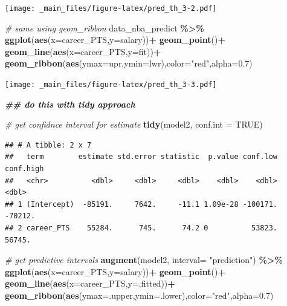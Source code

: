 \documentclass[
]{book}
\newenvironment{Shaded}{\begin{snugshade}}{\end{snugshade}}
\newcommand{\AttributeTok}[1]{\textcolor[rgb]{0.13,0.29,0.53}{#1}}
\newcommand{\CommentTok}[1]{\textcolor[rgb]{0.56,0.35,0.01}{\textit{#1}}}
\newcommand{\ConstantTok}[1]{\textcolor[rgb]{0.56,0.35,0.01}{#1}}
\newcommand{\DocumentationTok}[1]{\textcolor[rgb]{0.56,0.35,0.01}{\textbf{\textit{#1}}}}
\newcommand{\FloatTok}[1]{\textcolor[rgb]{0.00,0.00,0.81}{#1}}
\newcommand{\FunctionTok}[1]{\textcolor[rgb]{0.13,0.29,0.53}{\textbf{#1}}}
\newcommand{\NormalTok}[1]{#1}
\newcommand{\SpecialCharTok}[1]{\textcolor[rgb]{0.81,0.36,0.00}{\textbf{#1}}}
\newcommand{\StringTok}[1]{\textcolor[rgb]{0.31,0.60,0.02}{#1}}
\begin{document}
\texttt{[image: \_main\_files/figure-latex/pred\_th\_3-2.pdf]}

\begin{Shaded}
\begin{Highlighting}[]
\CommentTok{\# same using geom\_ribbon}
\NormalTok{data\_nba\_predict }\SpecialCharTok{\%\textgreater{}\%}
\FunctionTok{ggplot}\NormalTok{(}\FunctionTok{aes}\NormalTok{(}\AttributeTok{x=}\NormalTok{career\_PTS,}\AttributeTok{y=}\NormalTok{salary))}\SpecialCharTok{+}
  \FunctionTok{geom\_point}\NormalTok{()}\SpecialCharTok{+}
  \FunctionTok{geom\_line}\NormalTok{(}\FunctionTok{aes}\NormalTok{(}\AttributeTok{x=}\NormalTok{career\_PTS,}\AttributeTok{y=}\NormalTok{fit))}\SpecialCharTok{+}
  \FunctionTok{geom\_ribbon}\NormalTok{(}\FunctionTok{aes}\NormalTok{(}\AttributeTok{ymax=}\NormalTok{upr,}\AttributeTok{ymin=}\NormalTok{lwr),}\AttributeTok{color=}\StringTok{"red"}\NormalTok{,}\AttributeTok{alpha=}\FloatTok{0.7}\NormalTok{)}
\end{Highlighting}
\end{Shaded}

\texttt{[image: \_main\_files/figure-latex/pred\_th\_3-3.pdf]}

\begin{Shaded}
\begin{Highlighting}[]
\DocumentationTok{\#\# do this with tidy approach}

\CommentTok{\# get confidnce interval for estimate}
\FunctionTok{tidy}\NormalTok{(model2, }\AttributeTok{conf.int =} \ConstantTok{TRUE}\NormalTok{)}
\end{Highlighting}
\end{Shaded}

\begin{verbatim}
## # A tibble: 2 x 7
##   term        estimate std.error statistic  p.value conf.low conf.high
##   <chr>          <dbl>     <dbl>     <dbl>    <dbl>    <dbl>     <dbl>
## 1 (Intercept)  -85191.     7642.     -11.1 1.09e-28 -100171.   -70212.
## 2 career_PTS    55284.      745.      74.2 0          53823.    56745.
\end{verbatim}

\begin{Shaded}
\begin{Highlighting}[]
\CommentTok{\# get predictive intervals}
\FunctionTok{augment}\NormalTok{(model2, }\AttributeTok{interval=} \StringTok{"prediction"}\NormalTok{) }\SpecialCharTok{\%\textgreater{}\%}
  \FunctionTok{ggplot}\NormalTok{(}\FunctionTok{aes}\NormalTok{(}\AttributeTok{x=}\NormalTok{career\_PTS,}\AttributeTok{y=}\NormalTok{salary))}\SpecialCharTok{+}
  \FunctionTok{geom\_point}\NormalTok{()}\SpecialCharTok{+}
  \FunctionTok{geom\_line}\NormalTok{(}\FunctionTok{aes}\NormalTok{(}\AttributeTok{x=}\NormalTok{career\_PTS,}\AttributeTok{y=}\NormalTok{.fitted))}\SpecialCharTok{+}
  \FunctionTok{geom\_ribbon}\NormalTok{(}\FunctionTok{aes}\NormalTok{(}\AttributeTok{ymax=}\NormalTok{.upper,}\AttributeTok{ymin=}\NormalTok{.lower),}\AttributeTok{color=}\StringTok{"red"}\NormalTok{,}\AttributeTok{alpha=}\FloatTok{0.7}\NormalTok{)}
\end{Highlighting}
\end{Shaded}
\end{document}
